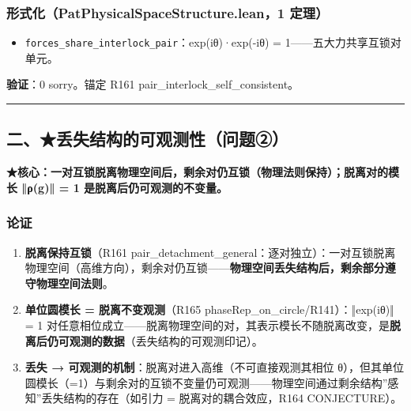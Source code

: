 \documentclass[
]{article}
\providecommand{\tightlist}{%
  \setlength{\itemsep}{0pt}\setlength{\parskip}{0pt}}
\begin{document}
\subsubsection{形式化（PatPhysicalSpaceStructure.lean，1
定理）}\label{ux5f62ux5f0fux5316patphysicalspacestructure.lean1-ux5b9aux7406}

\begin{itemize}
\tightlist
\item
  \texttt{forces\_share\_interlock\_pair}：exp(iθ)·exp(-iθ) =
  1------五大力共享互锁对单元。
\end{itemize}

\textbf{验证}：0 sorry。锚定 R161 pair\_interlock\_self\_consistent。

\begin{center}\rule{0.5\linewidth}{0.5pt}\end{center}

\subsection{二、★丢失结构的可观测性（问题②）}\label{ux4e8cux4e22ux5931ux7ed3ux6784ux7684ux53efux89c2ux6d4bux6027ux95eeux9898ux2461}

\textbf{★核心：一对互锁脱离物理空间后，剩余对仍互锁（物理法则保持）；脱离对的模长
‖ρ(g)‖ = 1 是脱离后仍可观测的不变量。}

\subsubsection{论证}\label{ux8bbaux8bc1-1}

\begin{enumerate}
\def\labelenumi{\arabic{enumi}.}
\tightlist
\item
  \textbf{脱离保持互锁}（R161
  pair\_detachment\_general：逐对独立）：一对互锁脱离物理空间（高维方向），剩余对仍互锁------\textbf{物理空间丢失结构后，剩余部分遵守物理空间法则}。
\item
  \textbf{单位圆模长 = 脱离不变观测}（R165
  phaseRep\_on\_circle/R141）：‖exp(iθ)‖ = 1
  对任意相位成立------脱离物理空间的对，其表示模长不随脱离改变，是\textbf{脱离后仍可观测的数据}（丢失结构的可观测印记）。
\item
  \textbf{丢失 → 可观测的机制}：脱离对进入高维（不可直接观测其相位
  θ），但其单位圆模长（=1）与剩余对的互锁不变量仍可观测------物理空间通过剩余结构''感知''丢失结构的存在（如引力
  = 脱离对的耦合效应，R164 CONJECTURE）。
\end{enumerate}
\end{document}
